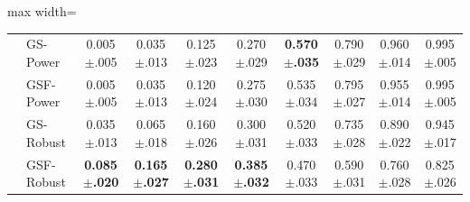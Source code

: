\begin{table}
\begin{adjustbox}{max width=\linewidth}
\begin{tabular}{llcccccccc}
 & GS-Power & 0.005{\scriptsize$\pm$.005} & 0.035{\scriptsize$\pm$.013} & 0.125{\scriptsize$\pm$.023} & 0.270{\scriptsize$\pm$.029} & \textbf{0.570{\scriptsize$\pm$.035}} & 0.790{\scriptsize$\pm$.029} & 0.960{\scriptsize$\pm$.014} & 0.995{\scriptsize$\pm$.005} \\
 & GSF-Power & 0.005{\scriptsize$\pm$.005} & 0.035{\scriptsize$\pm$.013} & 0.120{\scriptsize$\pm$.024} & 0.275{\scriptsize$\pm$.030} & 0.535{\scriptsize$\pm$.034} & 0.795{\scriptsize$\pm$.027} & 0.955{\scriptsize$\pm$.014} & 0.995{\scriptsize$\pm$.005} \\
 & GS-Robust & 0.035{\scriptsize$\pm$.013} & 0.065{\scriptsize$\pm$.018} & 0.160{\scriptsize$\pm$.026} & 0.300{\scriptsize$\pm$.031} & 0.520{\scriptsize$\pm$.033} & 0.735{\scriptsize$\pm$.028} & 0.890{\scriptsize$\pm$.022} & 0.945{\scriptsize$\pm$.017} \\
 & GSF-Robust & \textbf{0.085{\scriptsize$\pm$.020}} & \textbf{0.165{\scriptsize$\pm$.027}} & \textbf{0.280{\scriptsize$\pm$.031}} & \textbf{0.385{\scriptsize$\pm$.032}} & 0.470{\scriptsize$\pm$.033} & 0.590{\scriptsize$\pm$.031} & 0.760{\scriptsize$\pm$.028} & 0.825{\scriptsize$\pm$.026} \\
\bottomrule
\end{tabular}
\end{adjustbox}
\end{table}
